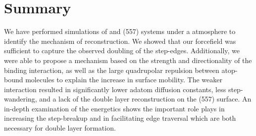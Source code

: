 \section{Summary}
We have performed simulations of  and  (557) systems under a
 atmosphere to identify the mechanism of reconstruction. We showed that
our  forcefield was sufficient to capture the observed
doubling of the  step-edges. Additionally, we were able to propose a
mechanism based on the strength and directionality of the 
binding interaction, as well as the large quadrupolar repulsion between
atop-bound  molecules to explain the increase in surface mobility. The
weaker  interaction resulted in significantly lower adatom
diffusion constants, less step-wandering, and a lack of the double layer
reconstruction on the  (557) surface. An in-depth examination of the
energetics shows the important role  plays in increasing the
step-breakup and in facilitating edge traversal which are both necessary for
double layer formation.

%

